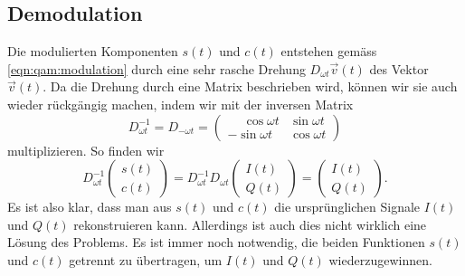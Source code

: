 %
%
%
\subsection{Demodulation
\label{subsection:demodulation}}
Die modulierten Komponenten $s(t)$ und $c(t)$ entstehen gemäss
\eqref{eqn:qam:modulation}
durch eine sehr rasche Drehung $D_{\omega t}\vec{v}(t)$
des Vektor $\vec{v}(t)$.
Da die Drehung durch eine Matrix beschrieben wird, können wir
sie auch wieder rückgängig machen, indem wir mit der inversen
Matrix
\[
D^{-1}_{\omega t} = D_{-\omega t}
=
\begin{pmatrix}
\phantom{-}\cos\omega t & \sin\omega t \\
         - \sin\omega t & \cos\omega t
\end{pmatrix}
\]
multiplizieren.
So finden wir
\[
D_{\omega t}^{-1}
\begin{pmatrix}s(t)\\c(t)\end{pmatrix}
=
D_{\omega t}^{-1}
D_{\omega t}
\begin{pmatrix} I(t)\\Q(t)\end{pmatrix}
=
\begin{pmatrix}
I(t)\\
Q(t)
\end{pmatrix}.
\]
Es ist also klar, dass man aus $s(t)$ und $c(t)$ die ursprünglichen Signale
$I(t)$ und $Q(t)$ rekonstruieren kann.
Allerdings ist auch dies nicht wirklich eine Lösung des Problems.
Es ist immer noch notwendig, die beiden Funktionen $s(t)$ und $c(t)$
getrennt zu übertragen, um $I(t)$ und $Q(t)$ wiederzugewinnen.

